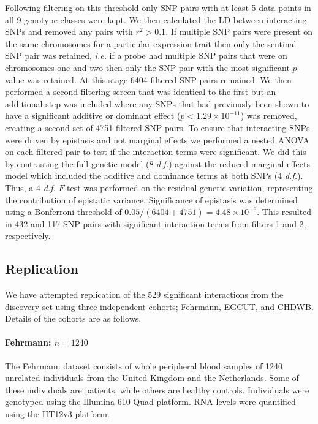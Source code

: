 \documentclass{article}
\begin{document}
Following filtering on this threshold only SNP pairs with at least 5 data points in all 9 genotype classes were kept. We then calculated the LD between interacting SNPs and removed any pairs with $r^2 > 0.1$. If multiple SNP pairs were present on the same chromosomes for a particular expression trait then only the sentinal SNP pair was retained, \emph{i.e.} if a probe had multiple SNP pairs that were on chromosomes one and two then only the SNP pair with the most significant $p$-value was retained. At this stage 6404 filtered SNP pairs remained. We then performed a second filtering screen that was identical to the first but an additional step was included where any SNPs that had previously been shown to have a significant additive or dominant effect ($p < 1.29 \times 10^{-11}$) was removed, creating a second set of 4751 filtered SNP pairs. To ensure that interacting SNPs were driven by epistasis and not marginal effects we performed a nested ANOVA on each filtered pair to test if the interaction terms were significant. We did this by contrasting the full genetic model (8 \emph{d.f.}) against the reduced marginal effects model which included the additive and dominance terms at both SNPs (4 \emph{d.f.}). Thus, a 4 \emph{d.f.} $F$-test was performed on the residual genetic variation, representing the contribution of epistatic variance. Significance of epistasis was determined using a Bonferroni threshold of $0.05 / (6404+4751) = 4.48 \times 10^{-6}$. This resulted in 432 and 117 SNP pairs with significant interaction terms from filters 1 and 2, respectively.


\subsection{Replication}
We have attempted replication of the 529 significant interactions from the discovery set using three independent cohorts; Fehrmann, EGCUT, and CHDWB. Details of the cohorts are as follows.  

\paragraph{Fehrmann: $n=1240$}
The Fehrmann dataset consists of whole peripheral blood samples of 1240 unrelated individuals from the United Kingdom and the Netherlands. Some of these individuals are patients, while others are healthy controls. Individuals were genotyped using the Illumina 610 Quad platform. RNA levels were quantified using the HT12v3 platform.
\end{document}
